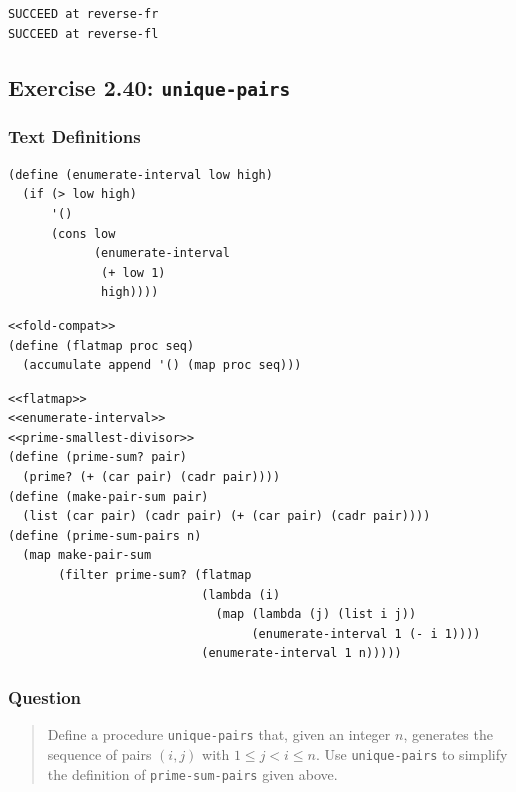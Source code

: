 \documentclass[final,fleqn,titlepage,twoside]{article}
\begin{document}
\begin{verbatim}
SUCCEED at reverse-fr
SUCCEED at reverse-fl
\end{verbatim}

\subsection{Exercise 2.40: \texttt{unique-pairs}}
\label{sec:orge458f4c}
\subsubsection{Text Definitions}
\label{sec:org84b049d}
\begin{verbatim}
(define (enumerate-interval low high)
  (if (> low high)
      '()
      (cons low 
            (enumerate-interval 
             (+ low 1) 
             high))))
\end{verbatim}

\begin{verbatim}
<<fold-compat>>
(define (flatmap proc seq)
  (accumulate append '() (map proc seq)))
\end{verbatim}
\begin{verbatim}
<<flatmap>>
<<enumerate-interval>>
<<prime-smallest-divisor>>
(define (prime-sum? pair)
  (prime? (+ (car pair) (cadr pair))))
(define (make-pair-sum pair)
  (list (car pair) (cadr pair) (+ (car pair) (cadr pair))))
(define (prime-sum-pairs n)
  (map make-pair-sum
       (filter prime-sum? (flatmap
                           (lambda (i)
                             (map (lambda (j) (list i j))
                                  (enumerate-interval 1 (- i 1))))
                           (enumerate-interval 1 n)))))
\end{verbatim}

\subsubsection{Question}
\label{sec:org6fd91e3}
\begin{quote}
Define a procedure \texttt{unique-pairs} that, given an integer \(n\),
generates the sequence of pairs \((i, j)\) with \(1 \le j < i \le n\). Use
\texttt{unique-pairs} to simplify the definition of
\texttt{prime-sum-pairs} given above.
\end{quote}
\end{document}
